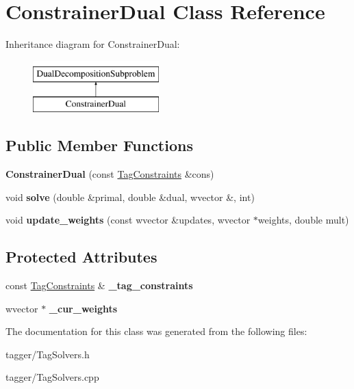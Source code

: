 \hypertarget{classConstrainerDual}{
\section{ConstrainerDual Class Reference}
\label{classConstrainerDual}
}
Inheritance diagram for ConstrainerDual:\begin{figure}[H]
\begin{center}
\leavevmode
\includegraphics[height=2cm]{classConstrainerDual}
\end{center}
\end{figure}
\subsection*{Public Member Functions}
\begin{DoxyCompactItemize}
\item 
\hypertarget{classConstrainerDual_ae74adbb392415eec3451dd5a20820b6b}{
{\bfseries ConstrainerDual} (const \hyperlink{classTagConstraints}{TagConstraints} \&cons)}
\label{classConstrainerDual_ae74adbb392415eec3451dd5a20820b6b}

\item 
\hypertarget{classConstrainerDual_a8cd72c1288fc93a0fec014095ac7252b}{
void {\bfseries solve} (double \&primal, double \&dual, wvector \&, int)}
\label{classConstrainerDual_a8cd72c1288fc93a0fec014095ac7252b}

\item 
\hypertarget{classConstrainerDual_a622b99f704a3324133f08521eb4924f5}{
void {\bfseries update\_\-weights} (const wvector \&updates, wvector $\ast$weights, double mult)}
\label{classConstrainerDual_a622b99f704a3324133f08521eb4924f5}

\end{DoxyCompactItemize}
\subsection*{Protected Attributes}
\begin{DoxyCompactItemize}
\item 
\hypertarget{classConstrainerDual_abda18ff85d425d3748f49709534ec9ea}{
const \hyperlink{classTagConstraints}{TagConstraints} \& {\bfseries \_\-tag\_\-constraints}}
\label{classConstrainerDual_abda18ff85d425d3748f49709534ec9ea}

\item 
\hypertarget{classConstrainerDual_a4dd6e580712c0b35da77e42e137c7274}{
wvector $\ast$ {\bfseries \_\-cur\_\-weights}}
\label{classConstrainerDual_a4dd6e580712c0b35da77e42e137c7274}

\end{DoxyCompactItemize}


The documentation for this class was generated from the following files:\begin{DoxyCompactItemize}
\item 
tagger/TagSolvers.h\item 
tagger/TagSolvers.cpp\end{DoxyCompactItemize}

